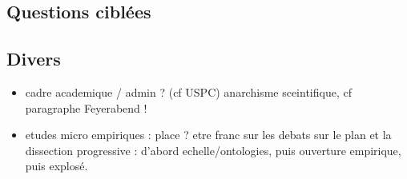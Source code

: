 \documentclass[11pt]{article}
\begin{document}
\subsection*{Questions ciblées}


\subsection*{Divers}

\begin{itemize}
	\item cadre academique / admin ? (cf USPC) anarchisme sceintifique, cf paragraphe Feyerabend !
	\item etudes micro empiriques : place ? etre franc sur les debats sur le plan et la dissection progressive : d'abord echelle/ontologies, puis ouverture empirique, puis explosé.
\end{itemize}
\end{document}
